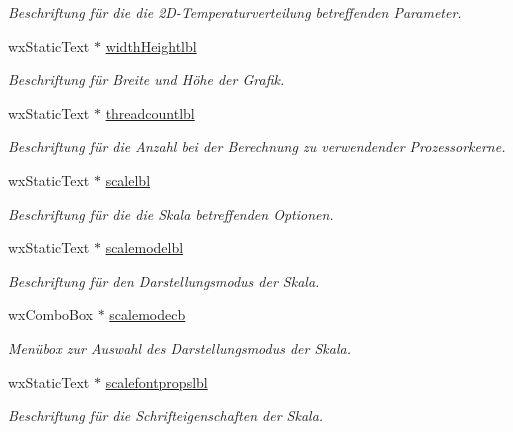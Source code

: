 \begin{DoxyCompactItemize}
\begin{DoxyCompactList}\small\item\em Beschriftung für die die 2\-D-\/\-Temperaturverteilung betreffenden Parameter. \end{DoxyCompactList}\item 
wx\-Static\-Text $\ast$ \hyperlink{classGUICutRenderWindow_a26632978654028e6fbfaa6eef704ff06}{width\-Heightlbl}
\begin{DoxyCompactList}\small\item\em Beschriftung für Breite und Höhe der Grafik. \end{DoxyCompactList}\item 
wx\-Static\-Text $\ast$ \hyperlink{classGUICutRenderWindow_a2797a52c219092ce3f54ea62ec4b95f3}{threadcountlbl}
\begin{DoxyCompactList}\small\item\em Beschriftung für die Anzahl bei der Berechnung zu verwendender Prozessorkerne. \end{DoxyCompactList}\item 
wx\-Static\-Text $\ast$ \hyperlink{classGUICutRenderWindow_a3c1e80a372d6eaacd4f6ca71a788c9fd}{scalelbl}
\begin{DoxyCompactList}\small\item\em Beschriftung für die die Skala betreffenden Optionen. \end{DoxyCompactList}\item 
wx\-Static\-Text $\ast$ \hyperlink{classGUICutRenderWindow_a2a3f0b64122aff2f336f94fb72b3b8ac}{scalemodelbl}
\begin{DoxyCompactList}\small\item\em Beschriftung für den Darstellungsmodus der Skala. \end{DoxyCompactList}\item 
wx\-Combo\-Box $\ast$ \hyperlink{classGUICutRenderWindow_af535e1e80e14178ff5c05707261a183d}{scalemodecb}
\begin{DoxyCompactList}\small\item\em Menübox zur Auswahl des Darstellungsmodus der Skala. \end{DoxyCompactList}\item 
wx\-Static\-Text $\ast$ \hyperlink{classGUICutRenderWindow_a1f46a30a61ad94b76a6194758bdb3f95}{scalefontpropslbl}
\begin{DoxyCompactList}\small\item\em Beschriftung für die Schrifteigenschaften der Skala. \end{DoxyCompactList}\item 

\end{DoxyCompactItemize}
